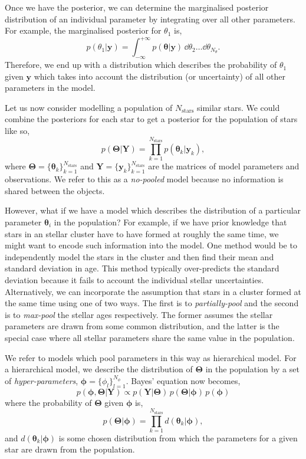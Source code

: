 Once we have the posterior, we can determine the marginalised posterior distribution of an individual parameter by integrating over all other parameters. For example, the marginalised posterior for $\theta_1$ is,
%
\begin{equation}
    p(\theta_1 | \bm{y}) = \int_{-\infty}^{+\infty} p(\bm{\theta} | \bm{y}) \, \dd \theta_2 \dots \dd \theta_{N_{\theta}}.
\end{equation}
%
Therefore, we end up with a distribution which describes the probability of $\theta_1$ given $\bm{y}$ which takes into account the distribution (or uncertainty) of all other parameters in the model.

Let us now consider modelling a population of $N_\mathrm{stars}$ similar stars. We could combine the posteriors for each star to get a posterior for the population of stars like so,
%
\begin{equation}
    p(\bm{\Theta}|\bm{Y}) = \prod_{k=1}^{N_\mathrm{stars}} p(\bm{\theta}_k|\bm{y}_k),
\end{equation}
%
where $\bm{\Theta} = \{\bm{\theta}_k\}_{k=1}^{N_\mathrm{stars}}$ and $\bm{Y} = \{\bm{y}_k\}_{k=1}^{N_\mathrm{stars}}$ are the matrices of model parameters and observations. We refer to this as a \emph{no-pooled} model because no information is shared between the objects. 

However, what if we have a model which describes the distribution of a particular parameter $\bm{\theta}_i$ in the population? For example, if we have prior knowledge that stars in an stellar cluster have to have formed at roughly the same time, we might want to encode such information into the model. One method would be to independently model the stars in the cluster and then find their mean and standard deviation in age. This method typically over-predicts the standard deviation because it fails to account the individual stellar uncertainties. Alternatively, we can incorporate the assumption that stars in a cluster formed at the same time using one of two ways. The first is to \emph{partially-pool} and the second is to \emph{max-pool} the stellar ages respectively. The former assumes the stellar parameters are drawn from some common distribution, and the latter is the special case where all stellar parameters share the same value in the population.

We refer to models which pool parameters in this way as hierarchical model. For a hierarchical model, we describe the distribution of $\bm{\Theta}$ in the population by a set of \emph{hyper-parameters}, $\bm{\phi} = \{ \phi_l \}_{l=1}^{N_\phi}$. Bayes' equation now becomes,
%
\begin{equation}
    p(\bm{\phi}, \bm{\Theta} | \bm{Y}) \propto p(\bm{Y} | \bm{\Theta}) \, p(\bm{\Theta} | \bm{\phi}) \, p(\bm{\phi})
\end{equation}
%
where the probability of $\bm{\Theta}$ given $\bm{\phi}$ is,
%
\begin{equation}
    p(\bm{\Theta} | \bm{\phi}) = \prod_{k=1}^{N_\mathrm{stars}} d(\bm{\theta}_k | \bm{\phi}),
\end{equation}
%
and $d(\bm{\theta}_k | \bm{\phi})$ is some chosen distribution from which the parameters for a given star are drawn from the population.


